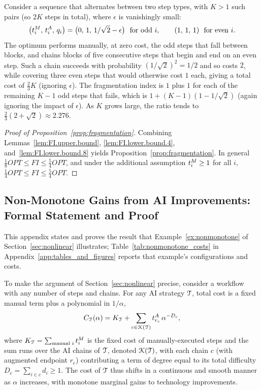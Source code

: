 \begin{example}
\label{ex:FI.necessity}
Consider a sequence that alternates between two step types, with $K > 1$ such pairs (so $2K$ steps in total), where $\epsilon$ is vanishingly small:
\[ \bigl(t^{M}_{i},\, t^{A}_{i},\, q_i\bigr) = \bigl(0,\, 1,\, 1/\sqrt{2}-\epsilon\bigr) \ \text{ for odd $i$}, \qquad (1,\,1,\,1) \ \text{ for even $i$}. \]
The optimum performs manually, at zero cost, the odd steps that fall between blocks, and chains blocks of five consecutive steps that begin and end on an even step.
Such a chain succeeds with probability $(1/\sqrt{2})^{2} = 1/2$ and so costs $2$, while covering three even steps that would otherwise cost $1$ each, giving a total cost of $\tfrac{2}{3}K$ (ignoring $\epsilon$).
The fragmentation index is $1$ plus $1$ for each of the remaining $K-1$ odd steps that fails, which is $1 + (K-1)(1 - 1/\sqrt{2})$ (again ignoring the impact of $\epsilon$).
As $K$ grows large, the ratio tends to $\tfrac{2}{3}(2+\sqrt{2}) \approx 2.276$.
\end{example}

\begin{proof}[Proof of Proposition~\ref{prop:fragmentation}]
Combining Lemmas~\ref{lem:FI.upper.bound}, \ref{lem:FI.lower.bound.4}, and~\ref{lem:FI.lower.bound.8} yields Proposition~\ref{prop:fragmentation}.
In general $\tfrac{1}{8}OPT \leq FI \leq \tfrac{5}{4}OPT$, and under the additional assumption $t^{M}_{i} \geq 1$ for all $i$, $\tfrac{1}{4}OPT \leq FI \leq \tfrac{5}{4}OPT$.
\end{proof}

\subsection{Non-Monotone Gains from AI Improvements: Formal Statement and Proof}
\label{app:nonmonotone}

This appendix states and proves the result that Example~\ref{ex:nonmonotone} of Section~\ref{sec:nonlinear} illustrates; Table~\ref{tab:nonmonotone_costs} in Appendix~\ref{app:tables_and_figures} reports that example's configurations and costs.

To make the argument of Section~\ref{sec:nonlinear} precise, consider a workflow with any number of steps and chains.
For any AI strategy $\mathcal{T}$, total cost is a fixed manual term plus a polynomial in $1/\alpha$,
\begin{equation}
\label{eq:strategy_cost}
C_{\mathcal{T}}(\alpha) = K_{\mathcal{T}} + \sum_{c \in \mathcal{K}(\mathcal{T})} t^{A}_{r_c}\,\alpha^{-D_c},
\end{equation}
where $K_{\mathcal{T}} = \sum_{\text{manual } i} t^{M}_{i}$ is the fixed cost of manually-executed steps and the sum runs over the AI chains of $\mathcal{T}$, denoted $\mathcal{K}(\mathcal{T})$, with each chain $c$ (with augmented endpoint $r_c$) contributing a term of degree equal to its total difficulty $D_c = \sum_{i \in c} d_i \ge 1$.
The cost of $\mathcal{T}$ thus shifts in a continuous and smooth manner as $\alpha$ increases, with monotone marginal gains to technology improvements.

